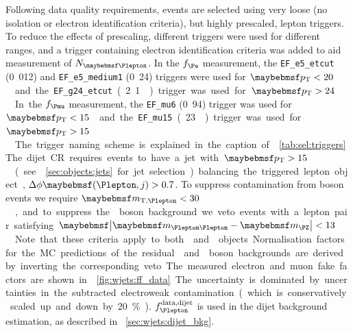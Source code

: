 Following data quality requirements, events are selected using very loose (no isolation 
or electron identification criteria), but highly prescaled, lepton triggers. To reduce 
the effects of prescaling, different triggers were used for different \pt ranges, and a 
trigger containing electron identification criteria was added to aid measurement of 
$N_{\id{\Plepton}}$. 
In the $f_{\Pe}$ measurement, the \verb|EF_e5_etcut| (\unit{0.012}{\invpb}) and 
\verb|EF_e5_medium1| (\unit{0.24}{\invpb}) triggers were used for \unit{$\pt < 20$}{\GeV} 
and the \verb|EF_g24_etcut| (\unit{2.1}{\invpb}) trigger was used for 
\unit{$\pt > 24$}{\GeV}. 
In the $f_{\Pmu}$ measurement, the \verb|EF_mu6| (\unit{0.94}{\invpb}) trigger was used 
for \unit{$\pt < 15$}{\GeV} and the \verb|EF_mu15| (\unit{23}{\invpb}) trigger was used 
for \unit{$\pt > 15$}{\GeV}. The trigger naming scheme is explained in the caption of 
\Table~\ref{tab:sel:triggers}.

The dijet CR requires events to have a jet with \unit{$\pt > 15$}{\GeV} (see 
\Section~\ref{sec:objects:jets} for jet selection) balancing the triggered lepton object,
$\Delta\phi\parenths{\Plepton,j} > 0.7$. To suppress contamination from \PW boson events we 
require \unit{$\mtw < 30$}{\GeV}, and to suppress the \PZ boson background we veto events 
with a lepton pair satisfying \unit{$\mods{\mll - \mZ} < 13$}{\GeV}. Note that these 
criteria apply to both \id{\Plepton} and \antiid{\Plepton} objects. Normalisation factors 
for the MC predictions of the residual \PW and \PZ boson backgrounds are derived by 
inverting the corresponding veto.

The measured electron and muon fake factors are shown in \Figure~\ref{fig:wjets:ff_data}. 
The uncertainty is dominated by uncertainties in the subtracted electroweak contamination 
(which is conservatively scaled up and down by 20\%). $f_{\Plepton}^{\text{data,dijet}}$ is 
used in the dijet background estimation, as described in \Section~\ref{sec:wjets:dijet_bkg}.

